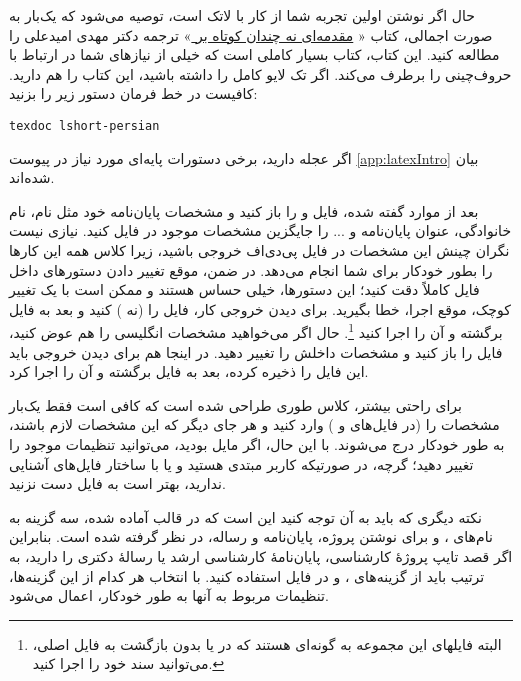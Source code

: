 حال اگر نوشتن \پ اولین تجربه شما از کار با لاتک است، توصیه می‌شود که یک‌بار به صورت اجمالی، کتاب «%
\href{http://www.tug.ctan.org/tex-archive/info/lshort/persian/lshort.pdf}{مقدمه‌ای نه چندان کوتاه بر
\lr{\LaTeXe}}%
»
ترجمه دکتر مهدی امیدعلی را مطالعه کنید. این کتاب، کتاب بسیار کاملی است که خیلی از نیازهای شما در ارتباط با حروف‌چینی را برطرف می‌کند.
اگر تک لایو کامل را داشته باشید، این کتاب را هم دارید. کافیست در خط فرمان دستور زیر را بزنید:
\begin{latin}
	\texttt{texdoc lshort-persian}
\end{latin}
اگر عجله دارید، برخی دستورات پایه‌ای مورد نیاز در پیوست \ref{app:latexIntro} بیان شده‌اند.
 
بعد از موارد گفته شده، فایل 
و
را باز کنید و مشخصات پایان‌نامه خود مثل نام، نام خانوادگی، عنوان پایان‌نامه و ... را جایگزین مشخصات موجود در فایل
 کنید. نیازی نیست نگران چینش این مشخصات در فایل پی‌دی‌اف خروجی باشید، زیرا کلاس 
همه این کارها را بطور خودکار برای شما انجام می‌دهد. در ضمن، موقع تغییر دادن دستورهای داخل فایل
 کاملاً دقت کنید؛ این دستورها، خیلی حساس هستند و ممکن است با یک تغییر کوچک، موقع اجرا، خطا بگیرید. برای دیدن خروجی کار، فایل 
 را 
(نه 
)
کنید و بعد به فایل 
برگشته و آن را اجرا کنید%
\footnote{
	البته فایلهای این مجموعه به گونه‌ای هستند که در
	 یا
	بدون بازگشت به فایل اصلی، می‌توانید سند خود را اجرا کنید.
}.
 حال اگر می‌خواهید مشخصات انگلیسی \پ را هم عوض کنید، فایل 
را باز کنید و مشخصات داخلش را تغییر دهید.
در اینجا هم برای دیدن خروجی باید این فایل را ذخیره کرده، بعد به فایل 
برگشته و آن را اجرا کرد.

برای راحتی بیشتر، کلاس 
طوری طراحی شده است که کافی است فقط  یک‌بار مشخصات \پ را (در فایل‌های
و
)
وارد کنید و هر جای دیگر که این مشخصات لازم باشند، به طور خودکار درج می‌شوند. با این حال، اگر مایل بودید، می‌توانید تنظیمات موجود را تغییر دهید؛ گرچه، در صورتیکه کاربر مبتدی هستید و یا با ساختار فایل‌های  
 آشنایی ندارید، بهتر است به فایل 
دست نزنید.

نکته دیگری که باید به آن توجه کنید این است که در قالب آماده شده، سه گزینه به نام‌های
،
و
برای نوشتن پروژه، پایان‌نامه و رساله، در نظر گرفته شده است. بنابراین اگر قصد تایپ پروژهٔ کارشناسی، پایان‌نامهٔ کارشناسی ارشد یا رسالهٔ دکتری را دارید، به ترتیب باید از گزینه‌های
،
و
در فایل 
استفاده کنید. با انتخاب هر کدام از این گزینه‌ها، تنظیمات مربوط به آنها به طور خودکار، اعمال می‌شود.


